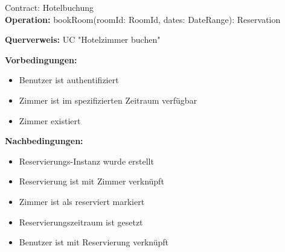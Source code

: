 \begin{example2}{Contract: Hotelbuchung}\\
\textbf{Operation:} bookRoom(roomId: RoomId, dates: DateRange): Reservation

\textbf{Querverweis:} UC "Hotelzimmer buchen"

\textbf{Vorbedingungen:}
\begin{itemize}
    \item Benutzer ist authentifiziert
    \item Zimmer ist im spezifizierten Zeitraum verfügbar
    \item Zimmer existiert
\end{itemize}

\textbf{Nachbedingungen:}
\begin{itemize}
    \item Reservierungs-Instanz wurde erstellt
    \item Reservierung ist mit Zimmer verknüpft
    \item Zimmer ist als reserviert markiert
    \item Reservierungszeitraum ist gesetzt
    \item Benutzer ist mit Reservierung verknüpft
\end{itemize}
\end{example2}

